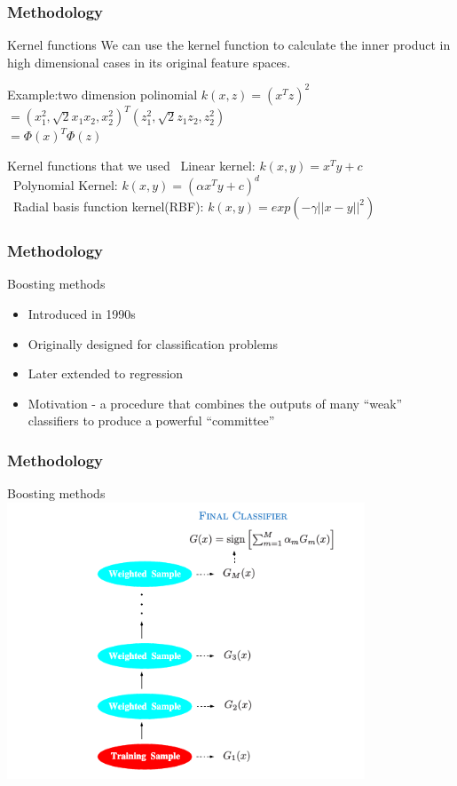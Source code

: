 \documentclass[xcolor={x11names,svgnames,dvipsnames}]{beamer}
\begin{document}
\begin{frame}
\frametitle{Methodology}
\begin{block}{Kernel functions}
We can use the kernel function to calculate the inner product in high dimensional cases in its original feature spaces.
\end{block}
\begin{block}{Example:two dimension polinomial}
$k(x,z)=(x^Tz)^2$\\
$=(x_1^2,\sqrt{2}x_1x_2,x_2^2)^T(z_1^2,\sqrt{2}z_1z_2,z_2^2)$\\
$=\Phi(x)^T\Phi(z)$\\
\end{block}
\begin{block}{Kernel functions that we used}
\small{
\textbullet\ {Linear kernel:  $k(x,y)=x^Ty+c$}\\
\textbullet\ {Polynomial Kernel:  $k(x,y)=(\alpha x^Ty+c)^d$}\\
\textbullet\ {Radial basis function kernel(RBF):  $k(x,y)=exp(-\gamma||x-y||^2)$}
}
\end{block}
\end{frame}

\begin{frame}
	\frametitle{Methodology}
	\begin{block}{Boosting methods}
	  \begin{itemize}
	  \item Introduced in 1990s
	  \item Originally designed for classification problems
	  \item Later extended to regression
	  \item Motivation - a procedure that \alert{combines the outputs of many “weak” classifiers to produce a powerful “committee”}	  
	  \end{itemize}
	\end{block}
\end{frame}

\begin{frame}
	\frametitle{Methodology}
	\begin{block}{Boosting methods}
      \includegraphics[width=0.8\textwidth, height=0.7\textheight]{boosting.png}
	\end{block}	
\end{frame}
\end{document}
